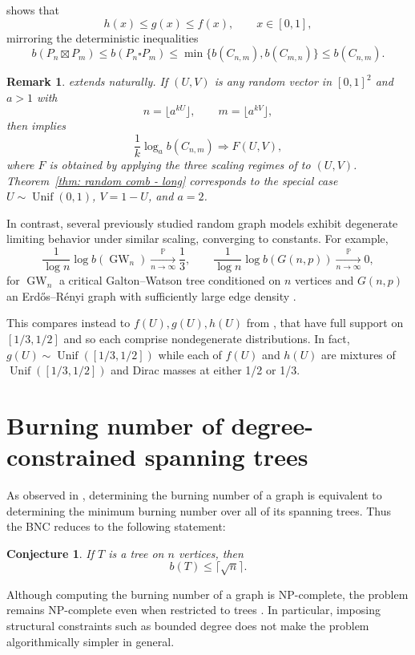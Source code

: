 \documentclass{article}
\def\Unif{\operatorname{Unif}}
\newtheorem{conjecture}{Conjecture}
\newtheorem{remark}{Remark}
\begin{document}
 shows that
\[
h(x) \le g(x) \le f(x), \qquad x\in[0,1],
\]
mirroring the deterministic inequalities
\[
b(P_n \boxtimes P_m)
\le
b(P_n \square P_m)
\le
\min\{b(C_{n,m}),b(C_{m,n})\}
\le
b(C_{n,m}).
\]

\begin{remark}
 extends naturally. 
If $(U,V)$ is any random vector in $[0,1]^2$ and $a > 1$ with
\[
n = \lfloor a^{ kU }\rfloor, 
\qquad 
m = \lfloor a^{ kV }\rfloor,
\]
then  implies
\[
\frac{1}{k}\log_a b(C_{n,m})
\Rightarrow
F(U,V),
\]
where $F$ is obtained by applying the three scaling regimes of  to $(U,V)$. Theorem~\ref{thm: random comb - long} corresponds to the special case $U\sim\Unif(0,1)$, $V=1-U$,  and $a = 2$.
\end{remark}

In contrast, several previously studied random graph models exhibit degenerate limiting behavior under similar scaling, converging to constants. For example,
\[
\frac1{\log n}\log b(\operatorname{GW}_n)
\xrightarrow[n\to\infty]{\mathbb P} \frac13,
\qquad
\frac1{\log n}\log b(G(n,p))
\xrightarrow[n\to\infty]{\mathbb P} 0,
\]
for $\operatorname{GW}_n$ a critical Galton--Watson tree conditioned on $n$ vertices and $G(n,p)$ an Erd\H{o}s--R\'enyi graph with sufficiently large edge density \cite{devroye2025burning,mitsche2017burning}. 

This compares instead to $f(U), g(U), h(U)$ from , that have full support on $[1/3,1/2]$ and so each comprise nondegenerate distributions. In fact, $g(U) \sim \Unif([1/3,1/2])$ while each of $f(U)$ and $h(U)$ are mixtures of $\Unif([1/3,1/2])$ and Dirac masses at either 1/2 or 1/3.

\section{Burning number of degree-constrained spanning trees}\label{sec: trees}

As observed in \cite{bonato2016burn}, determining the burning number of a graph is equivalent to determining the minimum burning number over all of its spanning trees. Thus the BNC reduces to the following statement:

\begin{conjecture}
If $T$ is a tree on $n$ vertices, then 
\[
b(T) \le \lceil \sqrt{n} \rceil.
\]
\end{conjecture}

Although computing the burning number of a graph is NP-complete, the problem remains NP-complete even when restricted to trees \cite{BessyBonatoJanssenRautenbachRoshanbin2017}. In particular, imposing structural constraints such as bounded degree does not make the problem algorithmically simpler in general.
\end{document}
